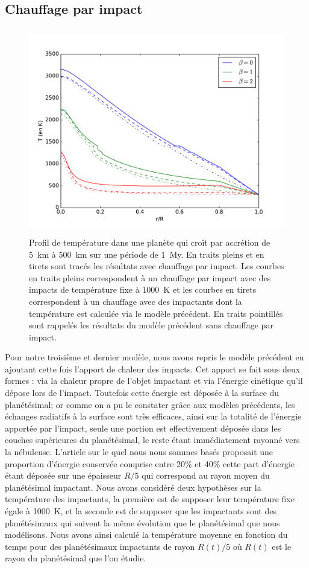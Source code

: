 \documentclass[10pt,a4paper]{article}
\numberwithin{equation}{section}
\begin{document}
\subsection{Chauffage par impact}

\begin{figure}[h!]
\centering
\includegraphics[height=9cm]{./figures/graph_sim3.pdf}
\caption{Profil de température dans une planète qui croît par accrétion de \SI{5}{km} à \SI{500}{km} sur une période de \SI{1}{My}. En traits pleins et en tirets sont tracés les résultats avec chauffage par impact. Les courbes en traits pleins correspondent à un chauffage par impact avec des impacts de température fixe à \SI{1000}{K} et les courbes en tirets correspondent à un chauffage avec des impactants dont la température est calculée via le modèle précédent. En traits pointillés sont rappelés les résultats du modèle précédent sans chauffage par impact.}
\label{fig3}
\end{figure}

Pour notre troisième et dernier modèle, nous avons repris le modèle précédent en ajoutant cette fois l'apport de chaleur des impacts. Cet apport se fait sous deux formes : via la chaleur propre de l'objet impactant et via l'énergie cinétique qu'il dépose lors de l'impact. Toutefois cette énergie est déposée à la surface du planétésimal; or comme on a pu le constater grâce aux modèles précédents, les échanges radiatifs à la surface sont très efficaces, ainsi sur la totalité de l'énergie apportée par l'impact, seule une portion est effectivement déposée dans les couches supérieures du planétésimal, le reste étant immédiatement rayonné vers la nébuleuse. L'article sur le quel nous nous sommes basés proposait une proportion d'énergie conservée comprise entre 20\% et 40\% cette part d'énergie étant déposée sur une épaisseur $R/5$ qui correspond au rayon moyen du planétésimal impactant.
Nous avons considéré deux hypothèses sur la température des impactants, la première est de supposer leur température fixe égale à \SI{1000}{K}, et la seconde est de supposer que les impactants sont des planétésimaux qui suivent la même évolution que le planétésimal que nous modélisons. Nous avons ainsi calculé la température moyenne en fonction du temps pour des planétésimaux impactants de rayon $R(t)/5$ où $R(t)$ est le rayon du planétésimal que l'on étudie.
\end{document}
